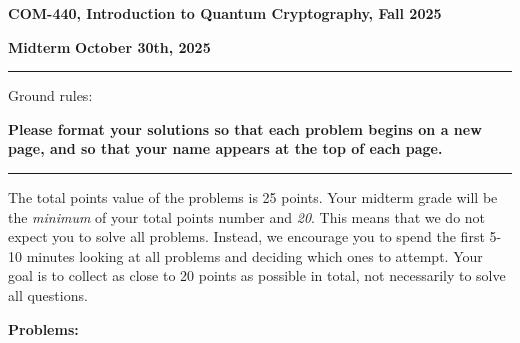 \documentclass[12pt]{article}
\newcommand{\header}[1]{\begin{center} {\large\bf #1} \end{center}}
\begin{document}
\header{COM-440, Introduction to Quantum Cryptography, Fall 2025}
{\bf Midterm} \hfill {\bf October 30th, 2025}


\medskip

\hrule

\medskip 

Ground rules: 

{\bf Please
  format your solutions so that each problem begins on a new page, and
  so that your name appears at the top of each page.}

\medskip
\hrule
\medskip

The total points value of the problems is 25 points. Your midterm grade will be the \emph{minimum} of your total points number and \emph{20}. This means that we do not expect you to solve all problems. Instead, we encourage you to spend the first 5-10 minutes looking at all problems and deciding which ones to attempt. Your goal is to collect as close to 20 points as possible in total, not necessarily to solve all questions. 
 
\medskip
{\bf Problems:}
\end{document}
